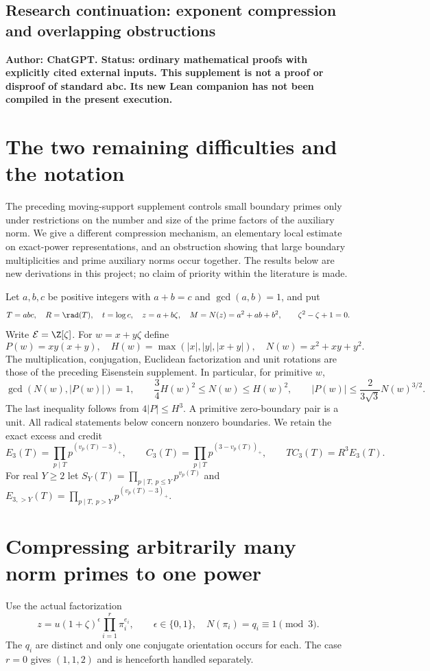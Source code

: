 \ifdefined\XCStandalone
\else
\clearpage
\subsection*{Research continuation: exponent compression and overlapping obstructions}
\fi
\noindent\textbf{Author: ChatGPT. Status: ordinary mathematical proofs with explicitly
cited external inputs. This supplement is not a proof or disproof of standard
abc. Its new Lean companion has not been compiled in the present execution.}

\section{The two remaining difficulties and the notation}
\label{sec:xc-scope}
The preceding moving-support supplement controls small boundary primes only
under restrictions on the number and size of the prime factors of the
auxiliary norm. We give a different compression mechanism, an elementary
local estimate on exact-power representations, and an obstruction showing
that large boundary multiplicities and prime auxiliary norms occur together.
The results below are new derivations in this project; no claim of priority
within the literature is made.

Let $a,b,c$ be positive integers with $a+b=c$ and $\gcd(a,b)=1$, and put
\[
 T=abc,\quad R=\rad(T),\quad t=\log c,\quad
 z=a+b\zeta,\quad M=N(z)=a^2+ab+b^2,
 \qquad\zeta^2-\zeta+1=0.
\]
Write $\mathcal E=\Z[\zeta]$. For $w=x+y\zeta$ define
\[
 P(w)=xy(x+y),\quad H(w)=\max(|x|,|y|,|x+y|),
 \quad N(w)=x^2+xy+y^2.
\]
The multiplication, conjugation, Euclidean factorization and unit rotations
are those of the preceding Eisenstein supplement. In particular, for
primitive $w$,
\begin{equation}\label{eq:xc-geometric}
 \gcd(N(w),|P(w)|)=1,\qquad
 \frac34H(w)^2\le N(w)\le H(w)^2,\qquad
 |P(w)|\le\frac{2}{3\sqrt3}N(w)^{3/2}.
\end{equation}
The last inequality follows from $4|P|\le H^3$. A primitive zero-boundary
pair is a unit. All radical statements below concern nonzero boundaries.
We retain the exact excess and credit
\[
 E_3(T)=\prod_{p\mid T}p^{(v_p(T)-3)_+},\qquad
 C_3(T)=\prod_{p\mid T}p^{(3-v_p(T))_+},\qquad
 TC_3(T)=R^3E_3(T).
\]
For real $Y\ge2$ let $S_Y(T)=\prod_{p\mid T,\ p\le Y}p^{v_p(T)}$ and
$E_{3,>Y}(T)=\prod_{p\mid T,\ p>Y}p^{(v_p(T)-3)_+}$.

\section{Compressing arbitrarily many norm primes to one power}
\label{sec:xc-content}
Use the actual factorization
\begin{equation}\label{eq:xc-factorization}
 z=u(1+\zeta)^\epsilon\prod_{i=1}^r\pi_i^{e_i},\qquad
 \epsilon\in\{0,1\},\quad N(\pi_i)=q_i\equiv1\pmod3.
\end{equation}
The $q_i$ are distinct and only one conjugate orientation occurs for each.
The case $r=0$ gives $(1,1,2)$ and is henceforth handled separately.

